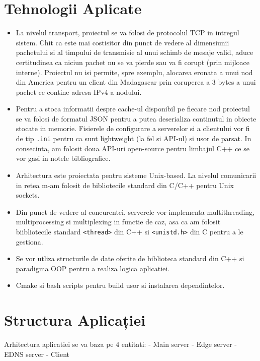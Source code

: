 \documentclass[runningheads]{llncs}
\begin{document}
\section{Tehnologii Aplicate}
\begin{itemize}
    \item La nivelul transport, proiectul se va folosi de protocolul TCP in intregul sistem. Chit ca este mai costisitor din punct de vedere al dimensiunii pachetului si al timpului de transmisie al unui schimb de mesaje valid, aduce certitudinea ca niciun pachet nu se va pierde sau va fi corupt (prin mijloace interne). Proiectul nu isi permite, spre exemplu, alocarea eronata a unui nod din America pentru un client din Madagascar prin coruperea a 3 bytes a unui pachet ce contine adresa IPv4 a nodului.
    
    \item Pentru a stoca informatii despre cache-ul disponibil pe fiecare nod proiectul se va folosi de formatul JSON pentru a putea deserializa continutul in obiecte stocate in memorie. Fisierele de configurare a serverelor si a clientului vor fi de tip \texttt{.ini} pentru ca sunt lightweight (la fel si API-ul) si usor de parsat. In consecinta, am folosit doua API-uri open-source pentru limbajul C++ ce se vor gasi in notele bibliografice.

    \item Arhitectura este proiectata pentru sisteme Unix-based. La nivelul comunicarii in retea m-am folosit de bibliotecile standard din C/C++
    pentru Unix sockets.

    \item Din punct de vedere al concurentei, serverele vor implementa multithreading, multiprocessing si multiplexing in functie de caz, asa ca am folosit biibliotecile standard \texttt{<thread>} din C++ si \texttt{<unistd.h>} din C pentru a le gestiona.
    
    \item Se vor utliza structurile de date oferite de biblioteca standard din C++ si paradigma OOP pentru a realiza logica aplicatiei. 
    
    \item Cmake si bash scripts pentru build usor si instalarea dependintelor. 

\end{itemize}

\section{Structura Aplicației}
Arhitectura aplicatiei se va baza pe 4 entitati: 
- Main server 
- Edge server
- EDNS server
- Client
\end{document}
